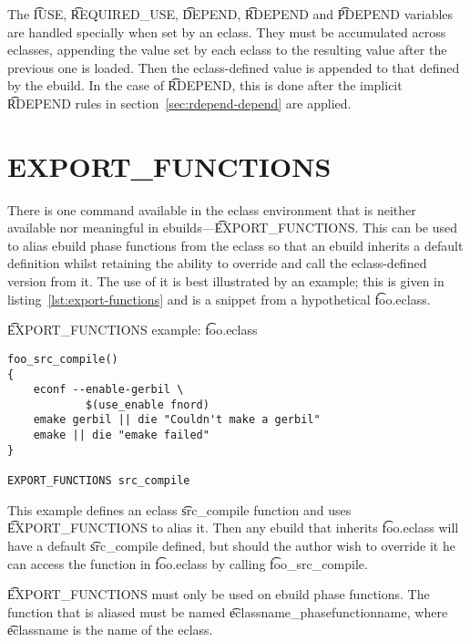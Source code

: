 The \t{IUSE}, \t{REQUIRED\_USE}, \t{DEPEND}, \t{RDEPEND} and \t{PDEPEND} variables are handled
specially when set by an eclass. They must be accumulated across eclasses, appending the value set
by each eclass to the resulting value after the previous one is loaded. Then the eclass-defined
value is appended to that defined by the ebuild. In the case of \t{RDEPEND}, this is done after the
implicit \t{RDEPEND} rules in section~\ref{sec:rdepend-depend} are applied.

\section{EXPORT\_FUNCTIONS}

There is one command available in the eclass environment that is neither available nor meaningful
in ebuilds---\t{EXPORT\_FUNCTIONS}\@. This can be used to alias ebuild phase functions from the
eclass so that an ebuild inherits a default definition whilst retaining the ability to override and
call the eclass-defined version from it. The use of it is best illustrated by an example; this is
given in listing~\ref{lst:export-functions} and is a snippet from a hypothetical \t{foo.eclass}.

\begin{listing}
\caption{\t{EXPORT\_FUNCTIONS} example: \t{foo.eclass}} \label{lst:export-functions}
\begin{verbatim}
foo_src_compile()
{
    econf --enable-gerbil \
            $(use_enable fnord)
    emake gerbil || die "Couldn't make a gerbil"
    emake || die "emake failed"
}

EXPORT_FUNCTIONS src_compile
\end{verbatim}
\end{listing}

This example defines an eclass \t{src\_compile} function and uses \t{EXPORT\_FUNCTIONS} to alias
it. Then any ebuild that inherits \t{foo.eclass} will have a default \t{src\_compile} defined, but
should the author wish to override it he can access the function in \t{foo.eclass} by calling
\t{foo\_src\_compile}.

\t{EXPORT\_FUNCTIONS} must only be used on ebuild phase functions. The function that is aliased
must be named \t{eclassname\_phasefunctionname}, where \t{eclassname} is the name of the eclass.


